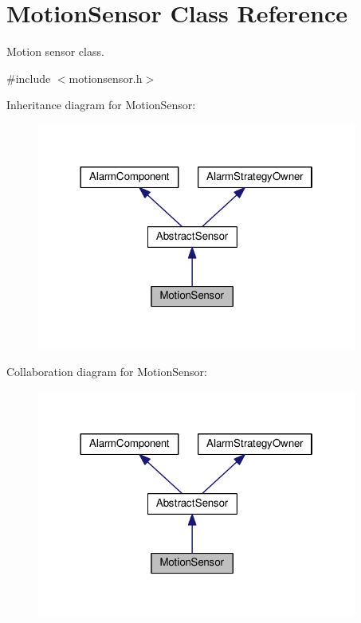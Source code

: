 \hypertarget{classMotionSensor}{}\section{Motion\+Sensor Class Reference}
\label{classMotionSensor}


Motion sensor class.  




{\ttfamily \#include $<$motionsensor.\+h$>$}



Inheritance diagram for Motion\+Sensor\+:\nopagebreak
\begin{figure}[H]
\begin{center}
\leavevmode
\includegraphics[width=298pt]{classMotionSensor__inherit__graph}
\end{center}
\end{figure}


Collaboration diagram for Motion\+Sensor\+:\nopagebreak
\begin{figure}[H]
\begin{center}
\leavevmode
\includegraphics[width=298pt]{classMotionSensor__coll__graph}
\end{center}
\end{figure}
